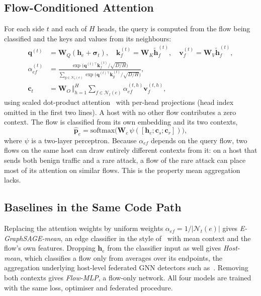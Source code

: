 \documentclass[journal]{IEEEtran}
\begin{document}
\subsection{Flow-Conditioned Attention}
For each side $t$ and each of $H$ heads, the query is computed from the flow being classified and the keys and values from its neighbours:
\begin{align}
\mathbf{q}^{(t)} &= \mathbf{W}_Q(\mathbf{h}_e+\boldsymbol{\sigma}_t),\quad
\mathbf{k}_f^{(t)} = \mathbf{W}_K\tilde{\mathbf{h}}_f^{(t)},\quad
\mathbf{v}_f^{(t)} = \mathbf{W}_V\tilde{\mathbf{h}}_f^{(t)},\\
\alpha_{ef}^{(t)} &= \frac{\exp\!\big(\mathbf{q}^{(t)\top}\mathbf{k}_f^{(t)}/\sqrt{D/H}\big)}{\sum_{g\in\mathcal{N}_t(e)}\exp\!\big(\mathbf{q}^{(t)\top}\mathbf{k}_g^{(t)}/\sqrt{D/H}\big)},\\
\mathbf{c}_t &= \mathbf{W}_O\,\big\Vert_{h=1}^{H}\sum_{f\in\mathcal{N}_t(e)}\alpha_{ef}^{(t,h)}\mathbf{v}_f^{(t,h)},
\end{align}
using scaled dot-product attention~\cite{vaswani2017attention} with per-head projections (head index omitted in the first two lines). A host with no other flow contributes a zero context. The flow is classified from its own embedding and its two contexts,
\begin{equation}
\hat{\mathbf{p}}_e=\mathrm{softmax}\big(\mathbf{W}_c\,\psi([\mathbf{h}_e;\mathbf{c}_s;\mathbf{c}_r])\big),
\end{equation}
where $\psi$ is a two-layer perceptron. Because $\alpha_{ef}$ depends on the query flow, two flows on the same host can draw entirely different contexts from it: on a host that sends both benign traffic and a rare attack, a flow of the rare attack can place most of its attention on similar flows. This is the property mean aggregation lacks.

\subsection{Baselines in the Same Code Path}
Replacing the attention weights by uniform weights $\alpha_{ef}=1/|\mathcal{N}_t(e)|$ gives \emph{E-GraphSAGE-mean}, an edge classifier in the style of~\cite{lo2022egraphsage} with mean context and the flow's own features. Dropping $\mathbf{h}_e$ from the classifier input as well gives \emph{Host-mean}, which classifies a flow only from averages over its endpoints, the aggregation underlying host-level federated GNN detectors such as~\cite{altfaily2025fedgatsage}. Removing both contexts gives \emph{Flow-MLP}, a flow-only network. All four models are trained with the same loss, optimiser and federated procedure.
\end{document}

